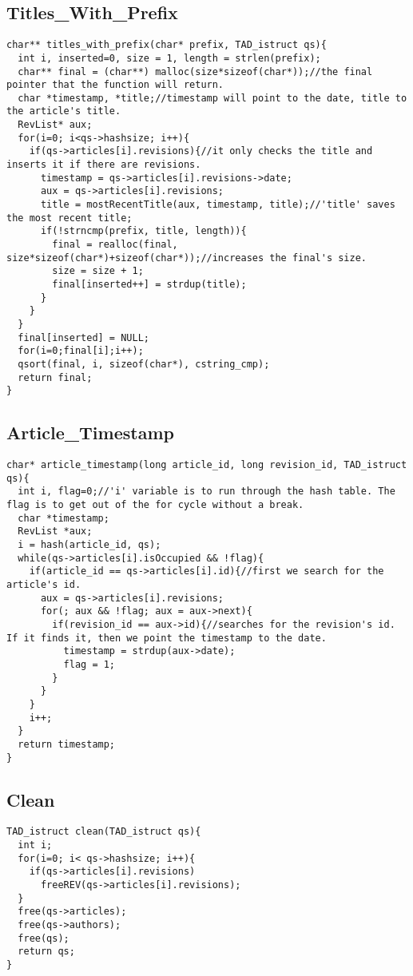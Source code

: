 \documentclass{article}
\begin{document}
\subsection{Titles\_With\_Prefix} \label{Titles}

\begin{lstlisting}
char** titles_with_prefix(char* prefix, TAD_istruct qs){
  int i, inserted=0, size = 1, length = strlen(prefix);
  char** final = (char**) malloc(size*sizeof(char*));//the final pointer that the function will return.
  char *timestamp, *title;//timestamp will point to the date, title to the article's title.
  RevList* aux;
  for(i=0; i<qs->hashsize; i++){
    if(qs->articles[i].revisions){//it only checks the title and inserts it if there are revisions.
      timestamp = qs->articles[i].revisions->date;
      aux = qs->articles[i].revisions;
      title = mostRecentTitle(aux, timestamp, title);//'title' saves the most recent title;
      if(!strncmp(prefix, title, length)){
        final = realloc(final, size*sizeof(char*)+sizeof(char*));//increases the final's size.
        size = size + 1;
        final[inserted++] = strdup(title);
      }
    }
  }
  final[inserted] = NULL;
  for(i=0;final[i];i++);
  qsort(final, i, sizeof(char*), cstring_cmp);
  return final;
}
\end{lstlisting}

\clearpage

\subsection{Article\_Timestamp} \label{Article Timestamp}

\begin{lstlisting}
char* article_timestamp(long article_id, long revision_id, TAD_istruct qs){
  int i, flag=0;//'i' variable is to run through the hash table. The flag is to get out of the for cycle without a break.
  char *timestamp;
  RevList *aux;
  i = hash(article_id, qs);
  while(qs->articles[i].isOccupied && !flag){
    if(article_id == qs->articles[i].id){//first we search for the article's id.
      aux = qs->articles[i].revisions;
      for(; aux && !flag; aux = aux->next){
        if(revision_id == aux->id){//searches for the revision's id. If it finds it, then we point the timestamp to the date.
          timestamp = strdup(aux->date);
          flag = 1;
        }
      }
    }
    i++;
  }
  return timestamp;
}
\end{lstlisting}

\subsection{Clean} \label{Clean}

\begin{lstlisting}
TAD_istruct clean(TAD_istruct qs){
  int i;
  for(i=0; i< qs->hashsize; i++){
    if(qs->articles[i].revisions)
      freeREV(qs->articles[i].revisions);
  }
  free(qs->articles);
  free(qs->authors);
  free(qs);
  return qs;
}
\end{lstlisting}
\end{document}
